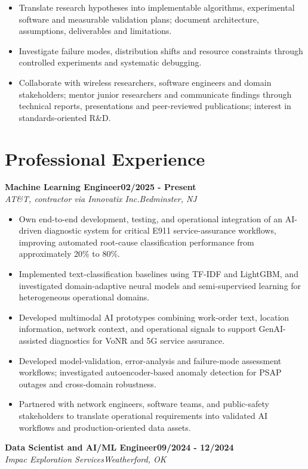 \documentclass[9pt,letterpaper]{extarticle}
\newcommand{\role}[4]{%
  \Needspace{4\baselineskip}\textbf{#1}\hfill\textbf{#2}\\[-1pt]
  \textit{#3}\hfill\textit{#4}\par}
\begin{document}
\begin{itemize}
\item Translate research hypotheses into implementable algorithms, experimental software and measurable validation plans; document architecture, assumptions, deliverables and limitations.
\item Investigate failure modes, distribution shifts and resource constraints through controlled experiments and systematic debugging.
\item Collaborate with wireless researchers, software engineers and domain stakeholders; mentor junior researchers and communicate findings through technical reports, presentations and peer-reviewed publications; interest in standards-oriented R\&D.
\end{itemize}
\section{Professional Experience}
\role{Machine Learning Engineer}{02/2025 - Present}{AT\&T, contractor via Innovatix Inc.}{Bedminster, NJ}
\begin{itemize}
\item Own end-to-end development, testing, and operational integration of an AI-driven diagnostic system for critical E911 service-assurance workflows, improving automated root-cause classification performance from approximately 20\% to 80\%.
\item Implemented text-classification baselines using TF-IDF and LightGBM, and investigated domain-adaptive neural models and semi-supervised learning for heterogeneous operational domains.
\item Developed multimodal AI prototypes combining work-order text, location information, network context, and operational signals to support GenAI-assisted diagnostics for VoNR and 5G service assurance.
\item Developed model-validation, error-analysis and failure-mode assessment workflows; investigated autoencoder-based anomaly detection for PSAP outages and cross-domain robustness.
\item Partnered with network engineers, software teams, and public-safety stakeholders to translate operational requirements into validated AI workflows and production-oriented data assets.
\end{itemize}
\role{Data Scientist and AI/ML Engineer}{09/2024 - 12/2024}{Impac Exploration Services}{Weatherford, OK}
\end{document}
